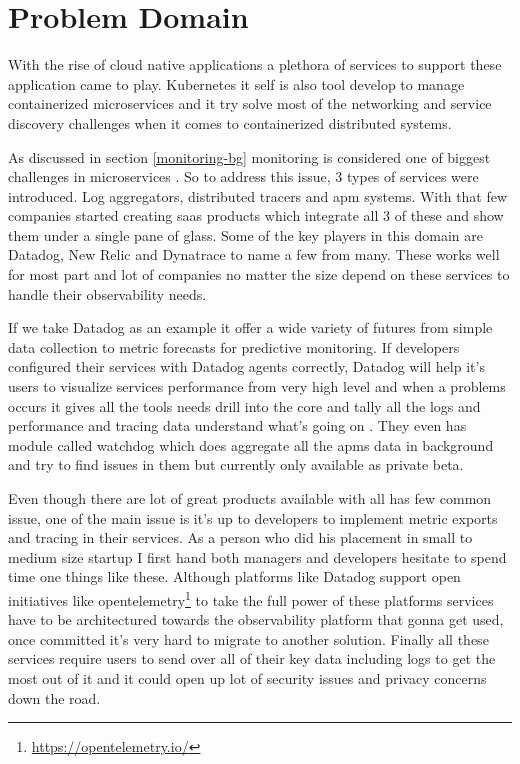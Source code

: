 \section{Problem Domain}

With the rise of cloud native applications \citep{CloudAdo16:online} a plethora of services to support these application came to play. Kubernetes it self is also tool develop to manage containerized microservices and it try solve most of the networking and service discovery challenges when it comes to containerized distributed systems.

As discussed in section \ref{monitoring-bg} monitoring is considered one of biggest challenges in microservices \citep{Understa56:online}. So to address this issue, 3 types of services were introduced. Log aggregators, distributed tracers and \ac{apm} systems. With that few companies started creating \ac{saas} products which integrate all 3 of these and show them under a single pane of glass. Some of the key players in this domain are Datadog, New Relic and Dynatrace to name a few from many. These works well for most part and lot of companies no matter the size depend on these services to handle their observability needs.

If we take Datadog as an example it offer a wide variety of futures from simple data collection to metric forecasts for predictive monitoring. If developers configured their services with Datadog agents correctly, Datadog will help it's users to visualize services performance from very high level and when a problems occurs it gives all the tools needs drill into the core and tally all the logs and performance and tracing data understand what's going on \citep{Datadog18:online}. They even has module called watchdog which does aggregate all the \acp{apm} data in background and try to find issues in them but currently only available as private beta.

Even though there are lot of great products available with all has few common issue, one of the main issue is it's up to developers to implement metric exports and tracing in their services. As a person who did his placement in small to medium size startup I first hand both managers and developers hesitate to spend time one things like these. Although platforms like Datadog support open initiatives like opentelemetry\footnote{\url{https://opentelemetry.io/}} to take the full power of these platforms services have to be architectured towards the observability platform that gonna get used, once committed it's very hard to migrate to another solution. Finally all these services require users to send over all of their key data including logs to get the most out of it and it could open up lot of security issues and privacy concerns down the road.

